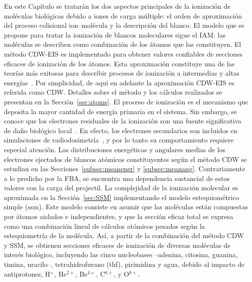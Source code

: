 En este Capítulo se tratarán los dos aspectos principales de la 
ionización de moléculas biológicas debido a iones de carga múltiple: el 
orden de aproximación del proceso colisional ion--molécula y la 
descripción del blanco. El modelo que se propone para tratar la 
ionización de blancos moleculares sigue el IAM: las moléculas se 
describen como combinación de los átomos que las constituyen. El método 
CDW-EIS es implementado para obtener valores confiables de 
secciones eficaces de ionización de los átomos. Esta aproximación 
constituye una de las teorías más exitosas para describir procesos de 
ionización a intermedias y altas energías~\cite{Miraglia:08,Miraglia:09}. 
Por simplicidad, de aquí en adelante la aproximación CDW-EIS es
referida como CDW. Detalles sobre el método y los cálculos realizados se 
presentan en la Sección~\ref{sec:atoms}. El proceso de ionización es el 
mecanismo que deposita la mayor cantidad de energía primaria en el 
sistema. Sin embargo, se conoce que los electrones residuales de la 
ionización son una fuente significativa de daño biológico 
local~\cite{Denifl:11}. En efecto, los electrones secundarios son 
incluidos en simulaciones de radiodosimetría~\cite{Champion:15,
Quinto:17,Acocer-Avila:19}, y por lo tanto su comportamiento requiere 
especial atención. Las distribuciones energéticas y angulares medias de 
los electrones ejectados de blancos atómicos constituyentes según el 
método CDW se estudian en las Secciones~\ref{subsec:meanener} y 
\ref{subsec:meanang}. Contrariamente a lo predicho por la FBA, se 
encuentra una dependencia sustancial de estos valores con la carga del 
projectil. La complejidad de la ionización molecular es aproximada en 
la Sección~\ref{sec:SSM} implementando el modelo estequiométrico simple 
(\acs{ssm}). Este modelo consiste en asumir que las moléculas están 
compuestas por átomos aislados e independientes, y que la sección eficaz 
total se expresa como una combinación lineal de cálculos atómicos 
pesados según la estequiometría de la molécula. Así, a partir de la 
combinación del método CDW y SSM, se obtienen secciones eficaces de 
ionización de diversas moléculas de interés biológico, incluyendo las 
cinco nucleobases --adenina, citosina, guanina, timina, uracilo--, 
tetrahidrofurano (\acs{thf}), pirimidina y agua, debido al impacto de 
antiprotones, H$^{+}$, He$^{2+}$, Be$^{4+}$, C$^{6+}$, y O$^{8+}$. 

